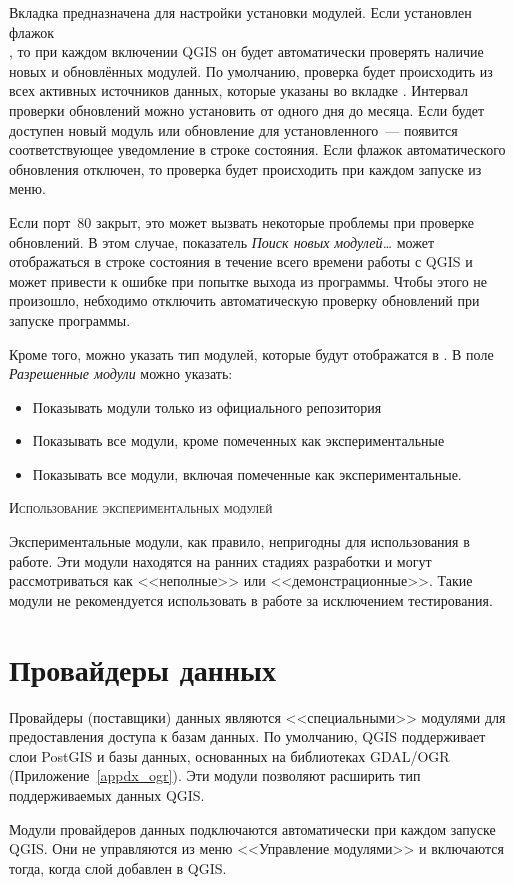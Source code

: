 
Вкладка  предназначена для настройки установки модулей.
Если установлен флажок \\
, то
при каждом включении QGIS он будет автоматически проверять наличие
новых и обновлённых модулей. По умолчанию, проверка будет происходить
из всех активных источников данных, которые указаны во вкладке
. Интервал проверки обновлений можно установить от
одного дня до месяца. Если будет доступен новый модуль или обновление
для установленного~--- появится соответствующее уведомление в строке
состояния. Если флажок автоматического обновления отключен, то проверка
будет происходить при каждом запуске  из
меню.

Если порт~80 закрыт, это может вызвать некоторые проблемы при
проверке обновлений. В этом случае, показатель
\textit{Поиск новых модулей\ldots} может отображаться в строке состояния
в течение всего времени работы с QGIS и может привести к ошибке при
попытке выхода из программы. Чтобы этого не произошло, небходимо
отключить автоматическую проверку обновлений при запуске программы.

Кроме того, можно указать тип модулей, которые будут отображатся в
. В поле \textit{Разрешенные модули} можно
указать:

\begin{itemize}[label=--]
\item Показывать модули только из официального репозитория
\item Показывать все модули, кроме помеченных как экспериментальные
\item Показывать все модули, включая помеченные как экспериментальные.
\end{itemize}

\begin{Tip}
 \caption{\textsc{Использование экспериментальных модулей}}
Экспериментальные модули, как правило, непригодны для использования в
работе. Эти модули находятся на ранних стадиях разработки и могут
рассмотриваться как <<неполные>> или <<демонстрационные>>. Такие модули
не рекомендуется использовать в работе за исключением тестирования.
\end{Tip}

\section{Провайдеры данных}

Провайдеры (поставщики) данных являются <<специальными>> модулями для
предоставления доступа к базам данных. По умолчанию, QGIS поддерживает
слои PostGIS и базы данных, основанных на библиотеках GDAL/OGR
(Приложение~\ref{appdx_ogr}). Эти модули позволяют расширить тип
поддерживаемых данных QGIS.

Модули провайдеров данных подключаются автоматически при каждом запуске
QGIS. Они не управляются из меню <<Управление модулями>> и включаются
тогда, когда слой добавлен в QGIS.

\FloatBarrier
